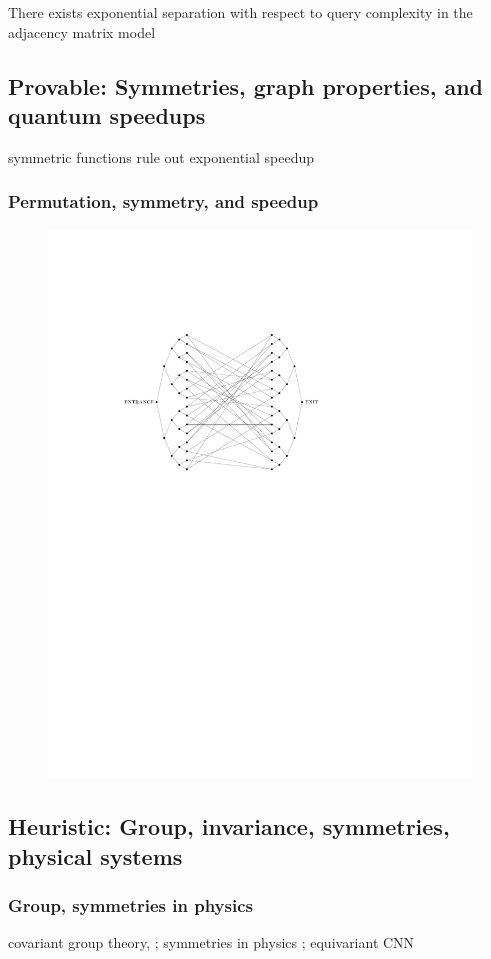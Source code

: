 \begin{theorem}
	There exists exponential separation with respect to query complexity in the adjacency matrix model
\end{theorem}
\cite{zhengSpeedingLearningQuantum2022}

\cite{liuRigorousRobustQuantum2021}

\subsection{Provable: Symmetries, graph properties, and quantum speedups}
symmetric functions rule out exponential speedup
\cite{ben-davidSymmetriesGraphProperties2020}
\subsubsection{Permutation, symmetry, and speedup}
\begin{figure}[!ht]
	\centering
	\includegraphics[width=.6\linewidth]{glued_tree.pdf}
	\caption{\cite{childsExponentialAlgorithmicSpeedup2003}}
\end{figure}

\subsection{Heuristic: Group, invariance, symmetries, physical systems}
\subsubsection{Group, symmetries in physics}
covariant 
\cite{glickCovariantQuantumKernels2021}
group theory, 
\cite{kondorGroupTheoreticalMethods2008};
symmetries in physics
\cite{bogatskiyLorentzGroupEquivariant2020};
equivariant CNN 
\cite{zhengSpeedingLearningQuantum2022}

